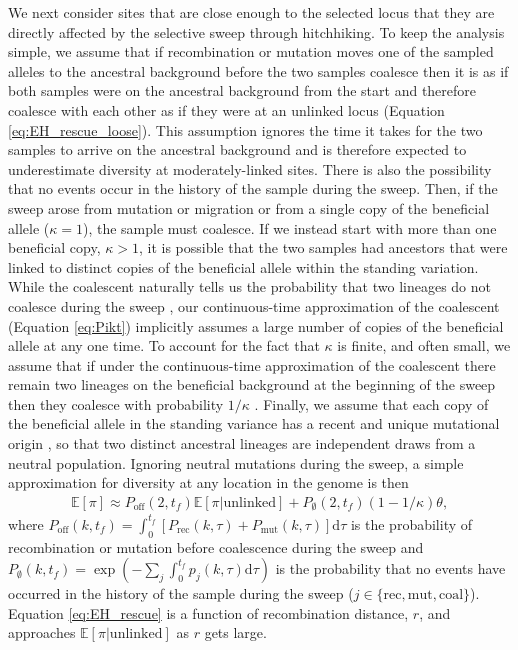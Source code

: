 \documentclass[]{article}
\begin{document}
We next consider sites that are close enough to the selected locus that they are directly affected by the selective sweep through hitchhiking.
To keep the analysis simple, we assume that if recombination or mutation moves one of the sampled alleles to the ancestral background before the two samples coalesce then it is as if both samples were on the ancestral background from the start and therefore coalesce with each other as if they were at an unlinked locus (Equation \ref{eq:EH_rescue_loose}).
This assumption ignores the time it takes for the two samples to arrive on the ancestral background and is therefore expected to underestimate diversity at moderately-linked sites.
There is also the possibility that no events occur in the history of the sample during the sweep.
Then, if the sweep arose from mutation or migration or from a single copy of the beneficial allele ($\kappa=1$), the sample must coalesce. 
If we instead start with more than one beneficial copy, $\kappa>1$, it is possible that the two samples had ancestors that were linked to distinct copies of the beneficial allele within the standing variation.
While the coalescent naturally tells us the probability that two lineages do not coalesce during the sweep \citep[since distinct copies of the beneficial allele are exchangeable; e.g.,][]{tavare1984line}, our continuous-time approximation of the coalescent (Equation \ref{eq:Pikt}) implicitly assumes a large number of copies of the beneficial allele at any one time.
To account for the fact that $\kappa$ is finite, and often small, we assume that if under the continuous-time approximation of the coalescent there remain two lineages on the beneficial background at the beginning of the sweep then they coalesce with probability $1/\kappa$ \citep[see the `instantaneous' approximation in][for a similar approach]{anderson2007estimation}.  
Finally, we assume that each copy of the beneficial allele in the standing variance has a recent and unique mutational origin \citep[implying the beneficial allele was sufficiently deleterious before the environmental change; c.f.,][]{prezeworski2005signature,berg2015coalescent}, so that two distinct ancestral lineages are independent draws from a neutral population.
Ignoring neutral mutations during the sweep, a simple approximation for diversity at any location in the genome is then
\begin{equation}\label{eq:EH_rescue}
\begin{aligned}
\mathbb{E}[\pi ] \approx P_\mathrm{off}(2,t_f) \mathbb{E}[\pi | \mathrm{unlinked}] + P_\emptyset(2,t_f) (1 - 1/\kappa) \theta,
\end{aligned}
\end{equation}
where $P_\mathrm{off}(k,t_f) = \int_0^{t_f} [P_\mathrm{rec}(k,\tau) + P_\mathrm{mut}(k,\tau)] \mathrm{d}\tau$ is the probability of recombination or mutation before coalescence during the sweep and $P_\emptyset(k, t_f) = \exp \left( -\sum_{j} \int_{0}^{t_f} p_{j}(k,\tau) \mathrm{d}\tau \right)$ is the probability that no events have occurred in the history of the sample during the sweep ($j\in\{\mathrm{rec},\mathrm{mut},\mathrm{coal}\}$).
Equation \ref{eq:EH_rescue} is a function of recombination distance, $r$, and approaches $\mathbb{E}[\pi | \mathrm{unlinked}]$ as $r$ gets large.
\end{document}
